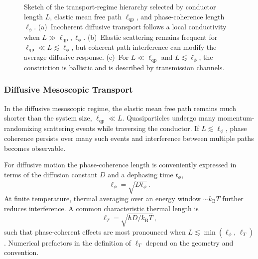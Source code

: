         \begin{figure}
            \centering
            \hfill
            \hfill
            \caption{
            Sketch of the transport-regime hierarchy selected by conductor length $L$, elastic mean free path $\ell_{\mathrm{qp}}$, and phase-coherence length $\ell_{\phi}$. (a)~Incoherent diffusive transport follows a local conductivity when $L \gg \ell_{\mathrm{qp}},\ell_{\phi}$. (b)~Elastic scattering remains frequent for $\ell_{\mathrm{qp}} \ll L \lesssim \ell_{\phi}$, but coherent path interference can modify the average diffusive response. (c)~For $L \ll \ell_{\mathrm{qp}}$ and $L \lesssim \ell_{\phi}$, the constriction is ballistic and is described by transmission channels.
            }
            \label{fig:quasi:meso}
        \end{figure}

        \subsubsection*{Diffusive Mesoscopic Transport}

            In the diffusive mesoscopic regime, the elastic mean free path remains much shorter than the system size, $\ell_\mathrm{qp} \ll L$. Quasiparticles undergo many momentum-randomizing scattering events while traversing the conductor. If $L \lesssim \ell_\phi$, phase coherence persists over many such events and interference between multiple paths becomes observable.

            For diffusive motion the phase-coherence length is conveniently expressed in terms of the diffusion constant $D$ and a dephasing time $t_\phi$,
            \begin{equation}
                \ell_\phi = \sqrt{D t_\phi}\,.
            \end{equation}
            At finite temperature, thermal averaging over an energy window $\sim k_\mathrm{B}T$ further reduces interference. A common characteristic thermal length is
            \begin{equation}
                \ell_T = \sqrt{\hbar D / k_\mathrm{B}T}\,,
            \end{equation}
            such that phase-coherent effects are most pronounced when $L \lesssim \min(\ell_\phi,\,\ell_T)$. Numerical prefactors in the definition of $\ell_T$ depend on the geometry and convention. \cite{bergmann_weak_1984,lee_disordered_1985}

